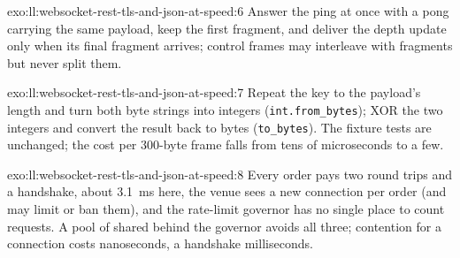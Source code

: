 \begin{solution}{exo:ll:websocket-rest-tls-and-json-at-speed:6}
Answer the ping at once with a pong carrying the same payload, keep the first fragment, and deliver the depth update only
when its final fragment arrives; control frames may interleave with fragments but never split them.
\end{solution}

\begin{solution}{exo:ll:websocket-rest-tls-and-json-at-speed:7}
Repeat the key to the payload's length and turn both byte strings into integers
(\texttt{int.from\_bytes}); XOR the two integers and convert the result back to bytes (\texttt{to\_bytes}). The fixture tests are unchanged; the cost per 300-byte frame falls
from tens of microseconds to a few.
\end{solution}

\begin{solution}{exo:ll:websocket-rest-tls-and-json-at-speed:8}
Every order pays two round trips and a handshake, about \qty{3.1}{\milli\second} here, the venue sees a new connection per
order (and may limit or ban them), and the rate-limit governor has no single place to count requests. A pool of  shared behind the governor avoids all three; contention for a connection costs nanoseconds, a handshake
milliseconds.
\end{solution}

